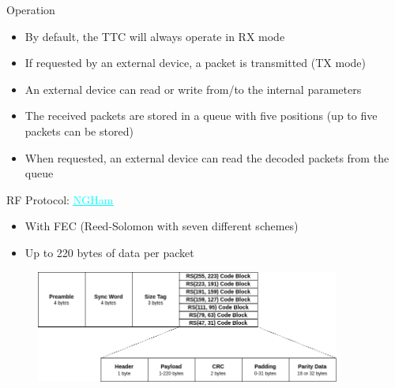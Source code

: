 %
%
%
%
%

%
%
%
%
%


\begin{frame}{Operation}

    \begin{itemize}
        \item By default, the TTC will always operate in RX mode
        \vspace{0.3cm}
        \item If requested by an external device, a packet is transmitted (TX mode)
        \vspace{0.3cm}
        \item An external device can read or write from/to the internal parameters
        \vspace{0.3cm}
        \item The received packets are stored in a queue with five positions (up to five packets can be stored)
        \vspace{0.3cm}
        \item When requested, an external device can read the decoded packets from the queue
    \end{itemize}

\end{frame}

\begin{frame}{RF Protocol: \href{https://mgm8.github.io/pyngham/protocol.html}{\textcolor{cyan}{\underline{NGHam}}}}

    \begin{itemize}
        \item With FEC (Reed-Solomon with seven different schemes)
        \item Up to 220 bytes of data per packet
    \end{itemize}

    \begin{figure}[!ht]
        \begin{center}
            \includegraphics[width=10cm]{figures/ngham-pkt.png}
        \end{center}
    \end{figure}

\end{frame}

